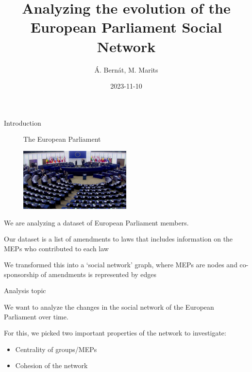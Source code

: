 \documentclass{beamer}
\title{Analyzing the evolution of the European Parliament Social Network}
\date{2023-11-10}
\author{Á. Bernát, M. Marits}
\begin{document}
\begin{frame}[plain]
    \maketitle
\end{frame}

\begin{frame}{Introduction}
	
	\begin{figure}
		The European Parliament
	
		\includegraphics[width=0.5\textwidth]{img/euparl.jpg}
	\end{figure}

	\pause We are analyzing a dataset of European Parliament members.
	
	\vspace{2mm}
	
	\pause Our dataset is a list of amendments to laws that includes information on the MEPs who contributed to each law
	
	\vspace{2mm}
	
	\pause We transformed this into a `social network' graph, where MEPs are nodes and co-sponsorship of amendments is represented by edges

	
\end{frame}

\begin{frame}{Analysis topic}
	
	We want to analyze the changes in the social network of the European Parliament over time.
	
	\vspace{2mm}
	
	\pause For this, we picked two important properties of the network to investigate:
	\begin{itemize}
		\pause \item Centrality of groups/MEPs
		
		\pause \item Cohesion of the network
	\end{itemize}
	
\end{frame}
\end{document}
